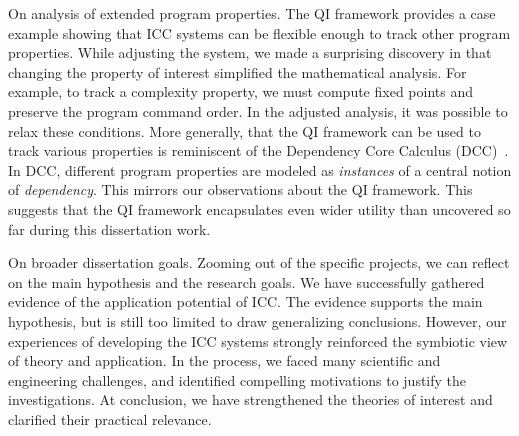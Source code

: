 {On analysis of extended program properties.} The QI framework provides a case
example showing that ICC systems can be flexible enough to track other program
properties. While adjusting the system, we made a surprising discovery in that
changing the property of interest simplified the mathematical analysis. For
example, to track a complexity property, we must compute fixed points and
preserve the program command order. In the adjusted analysis, it was possible to
relax these conditions. More generally, that the QI framework can be used to
track various properties is reminiscent of the Dependency Core Calculus
(DCC)~\cite{abadi1999b}. In DCC, different
program properties are modeled as \emph{instances} of a central notion of
\emph{dependency}. This mirrors our observations about the QI framework. This
suggests that the QI framework encapsulates even wider utility than uncovered so
far during this dissertation work.

{On broader dissertation goals.} Zooming out of the specific projects, we can
reflect on the main hypothesis and the research goals. We have successfully
gathered evidence of the application potential of ICC. The evidence supports the
main hypothesis, but is still too limited to draw generalizing conclusions.
However, our experiences of developing the ICC systems strongly reinforced the
symbiotic view of theory and application. In the process, we faced many
scientific and engineering challenges, and identified compelling motivations to
justify the investigations. At conclusion, we have strengthened the theories of
interest and clarified their practical relevance.

